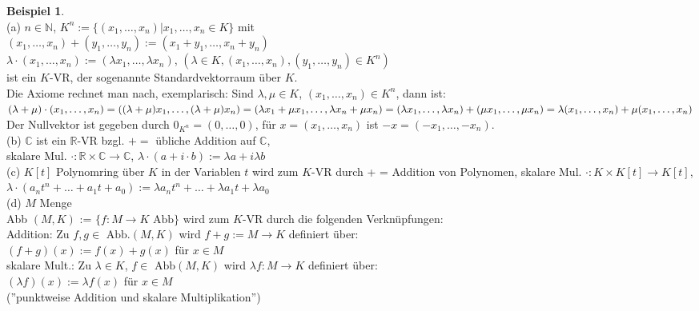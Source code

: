 \documentclass[10pt,a4paper,numbers=endperiod]{scrartcl}
\theoremstyle{definition}
\newtheorem{bsp}[satz]{Beispiel}
\begin{document}
\begin{bsp}
	$ $\\
	(a) $n \in \mathbb{N}$, $K^n := \{(x_1, \dots, x_n)| x_1, \dots, x_n \in K\}$ mit\\
	$(x_1, \dots, x_n) + (y_1, \dots, y_n) := (x_1+y_1, \dots, x_n+y_n)$\\
	$\lambda \cdot (x_1, \dots, x_n) := (\lambda x_1, \dots, \lambda x_n)$, $(\lambda \in K, (x_1, \dots, x_n), (y_1, \dots, y_n) \in K^n)$\\
	ist ein $K$-VR, der sogenannte Standardvektorraum über $K$.\\
	Die Axiome rechnet man nach, exemplarisch: Sind $\lambda, \mu \in K$, $(x_1, \dots, x_n) \in K^n$, dann ist: $(\lambda + \mu) \cdot (x_1, \dots, x_n) = ((\lambda + \mu)x_1, \dots, (\lambda + \mu) x_n) = (\lambda x_1 + \mu x_1, \dots, \lambda x_n+\mu x_n)\\= (\lambda x_1, \dots, \lambda x_n)+(\mu x_1, \dots, \mu x_n) = \lambda(x_1, \dots, x_n) + \mu(x_1, \dots, x_n)$\\
	Der Nullvektor ist gegeben durch $0_{K^n} = (0, \dots, 0)$, für $x=(x_1, \dots, x_n)$ ist $-x=(-x_1, \dots, -x_n)$.\\
	
	(b) $\mathbb{C}$ ist ein $\mathbb{R}$-VR bzgl. $+ =$ übliche Addition auf $\mathbb{C}$,\\
	skalare Mul. $\cdot: \mathbb{R} \times \mathbb{C} \rightarrow \mathbb{C}$, $\lambda \cdot(a+i\cdot b) := \lambda a + i \lambda b$\\
	
	(c) $K[t]$ Polynomring über $K$ in der Variablen $t$ wird zum $K$-VR durch + = Addition von Polynomen, skalare Mul. $\cdot: K \times K[t] \rightarrow K[t]$, $\lambda \cdot (a_nt^n+ \dots + a_1t+a_0) := \lambda a_nt^n+ \dots + \lambda a_1t + \lambda a_0$\\
	
	(d) $M$ Menge\\
	Abb $(M,K)$ := $\{f: M \rightarrow K \text{ Abb}\}$ wird zum $K$-VR durch die folgenden Verknüpfungen:\\
	Addition: Zu $f,g \in \text{ Abb.}(M,K)$ wird $f+g:= M \rightarrow K$ definiert über: \\
	$(f+g)(x) := f(x) + g(x)$ für $x \in M$\\
	skalare Mult.: Zu $\lambda \in K$, $f \in \text{ Abb}(M,K)$ wird $\lambda f: M \rightarrow K$ definiert über:\\
	$(\lambda f) (x):= \lambda f(x)$ für $x \in M$\\
	(''punktweise Addition und skalare Multiplikation'')
\end{bsp}
\end{document}
